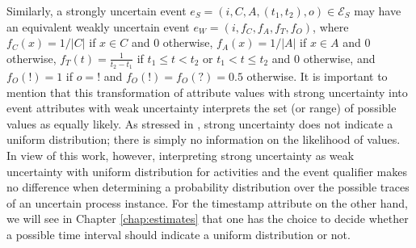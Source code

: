 Similarly, a strongly uncertain event $e_S=(i,C,A,(t_1,t_2),o) \in \mathcal{E}_S$ may have an equivalent weakly uncertain event $e_W=(i,f_C,f_A,f_T,f_O)$, where $f_C(x)=1/|C|$ if $x \in C$ and 0 otherwise, $f_A(x)=1/|A|$ if $x \in A$ and 0 otherwise, $f_T(t)=\frac{1}{t_2-t_1}$ if $t_1 \leq t < t_2$ or $t_1 < t \leq t_2$ and 0 otherwise, and $f_O(!)=1$ if $o=!$ and $f_O(!)=f_O(?)=0.5$ otherwise.
It is important to mention that this transformation of attribute values with strong uncertainty into event attributes with weak uncertainty interprets the set (or range) of possible values as equally likely.
As stressed in \cite{mining}, strong uncertainty does not indicate a uniform distribution; there is simply no information on the likelihood of values.
In view of this work, however, interpreting strong uncertainty as weak uncertainty with uniform distribution for activities and the event qualifier makes no difference when determining a probability distribution over the possible traces of an uncertain process instance.
For the timestamp attribute on the other hand, we will see in Chapter \ref{chap:estimates} that one has the choice to decide whether a possible time interval should indicate a uniform distribution or not.

